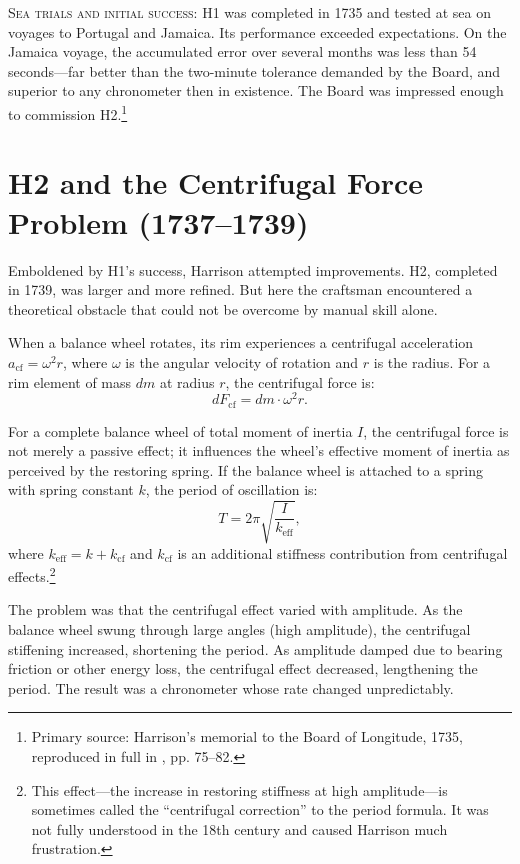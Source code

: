 \textsc{Sea trials and initial success:} H1 was completed in 1735 and tested at sea on voyages to Portugal and Jamaica. Its performance exceeded expectations. On the Jamaica voyage, the accumulated error over several months was less than 54 seconds—far better than the two-minute tolerance demanded by the Board, and superior to any chronometer then in existence. The Board was impressed enough to commission H2.\footnote{Primary source: Harrison's memorial to the Board of Longitude, 1735, reproduced in full in \textcite{Sobel1995}, pp. 75--82.}

\section{H2 and the Centrifugal Force Problem (1737--1739)}

Emboldened by H1's success, Harrison attempted improvements. H2, completed in 1739, was larger and more refined. But here the craftsman encountered a theoretical obstacle that could not be overcome by manual skill alone.

When a balance wheel rotates, its rim experiences a centrifugal acceleration $a_{\text{cf}} = \omega^2 r$, where $\omega$ is the angular velocity of rotation and $r$ is the radius. For a rim element of mass $dm$ at radius $r$, the centrifugal force is:
\[
  dF_{\text{cf}} = dm \cdot \omega^2 r.
\]

For a complete balance wheel of total moment of inertia $I$, the centrifugal force is not merely a passive effect; it influences the wheel's effective moment of inertia as perceived by the restoring spring. If the balance wheel is attached to a spring with spring constant $k$, the period of oscillation is:
\[
  T = 2\pi\sqrt{\frac{I}{k_{\text{eff}}}},
\]
where $k_{\text{eff}} = k + k_{\text{cf}}$ and $k_{\text{cf}}$ is an additional stiffness contribution from centrifugal effects.\footnote{This effect—the increase in restoring stiffness at high amplitude—is sometimes called the ``centrifugal correction'' to the period formula. It was not fully understood in the 18th century and caused Harrison much frustration.}

The problem was that the centrifugal effect varied with amplitude. As the balance wheel swung through large angles (high amplitude), the centrifugal stiffening increased, shortening the period. As amplitude damped due to bearing friction or other energy loss, the centrifugal effect decreased, lengthening the period. The result was a chronometer whose rate changed unpredictably.

